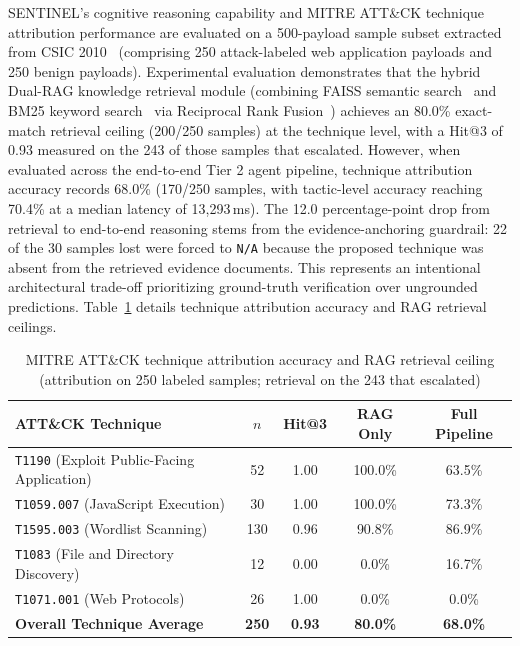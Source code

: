 SENTINEL's cognitive reasoning capability and MITRE ATT\&CK technique attribution performance are evaluated on a 500-payload sample subset extracted from CSIC 2010~\cite{csic2010} (comprising 250 attack-labeled web application payloads and 250 benign payloads). Experimental evaluation demonstrates that the hybrid Dual-RAG knowledge retrieval module (combining FAISS semantic search~\cite{faiss2019} and BM25 keyword search~\cite{bm25_2009} via Reciprocal Rank Fusion~\cite{rrf2009}) achieves an 80.0\% exact-match retrieval ceiling (200/250 samples) at the technique level, with a Hit@3 of 0.93 measured on the 243 of those samples that escalated. However, when evaluated across the end-to-end Tier 2 agent pipeline, technique attribution accuracy records 68.0\% (170/250 samples, with tactic-level accuracy reaching 70.4\% at a median latency of 13,293\,ms). The 12.0 percentage-point drop from retrieval to end-to-end reasoning stems from the evidence-anchoring guardrail: 22 of the 30 samples lost were forced to \texttt{N/A} because the proposed technique was absent from the retrieved evidence documents. This represents an intentional architectural trade-off prioritizing ground-truth verification over ungrounded predictions. Table~\ref{tab:rq3_attribution} details technique attribution accuracy and RAG retrieval ceilings.

\begin{table}[htbp]
\centering
\caption[MITRE ATT\&CK technique attribution accuracy and RAG ceiling]{MITRE ATT\&CK technique attribution accuracy and RAG retrieval ceiling (attribution on 250 labeled samples; retrieval on the 243 that escalated)}
\label{tab:rq3_attribution}
\footnotesize
\setlength{\tabcolsep}{4pt}
\begin{tabularx}{\textwidth}{>{\raggedright\arraybackslash}X c c c c}
\toprule
\textbf{ATT\&CK Technique} & \textbf{$n$} & \textbf{Hit@3} & \textbf{RAG Only} & \textbf{Full Pipeline} \\
\midrule
\texttt{T1190} (Exploit Public-Facing Application) & 52 & 1.00 & 100.0\% & 63.5\% \\
\texttt{T1059.007} (JavaScript Execution) & 30 & 1.00 & 100.0\% & 73.3\% \\
\texttt{T1595.003} (Wordlist Scanning) & 130 & 0.96 & 90.8\% & 86.9\% \\
\texttt{T1083} (File and Directory Discovery) & 12 & 0.00 & 0.0\% & 16.7\% \\
\texttt{T1071.001} (Web Protocols) & 26 & 1.00 & 0.0\% & 0.0\% \\
\midrule
\textbf{Overall Technique Average} & \textbf{250} & \textbf{0.93} & \textbf{80.0\%} & \textbf{68.0\%} \\
\bottomrule
\end{tabularx}
\end{table}

